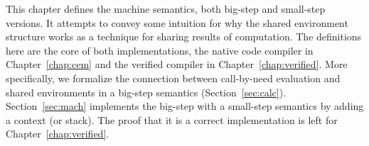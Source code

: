 This chapter defines the \ce machine semantics, both big-step and small-step
versions. It attempts to convey some intuition for why the shared environment
structure works as a technique for sharing results of computation. The
definitions here are the core of both implementations, the native code compiler
in Chapter~\ref{chap:cem} and the verified compiler in
Chapter~\ref{chap:verified}. More specifically, we formalize the connection
between call-by-need evaluation and shared environments in a big-step semantics
(Section~\ref{sec:calc}).  Section~\ref{sec:mach} implements the big-step with a
small-step semantics by adding a context (or stack). The proof that it is a
correct implementation is left for Chapter~\ref{chap:verified}.
